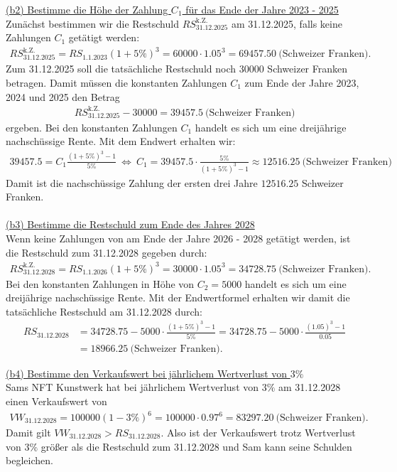 \underline{(b2) Bestimme die Höhe der Zahlung $C_1$ für das Ende der Jahre 2023 - 2025}\\
Zunächst bestimmen wir die Restschuld $RS_{\mathrm{31.12.2025}}^{\mathrm{k.Z.}}$ am 31.12.2025, falls keine Zahlungen $C_1$ getätigt werden:
\begin{align*}
RS_{\mathrm{31.12.2025}}^{\mathrm{k.Z.}}
	=
	RS_{\mathrm{1.1.2023}}
	(1+ 5\% )^3
	=
	60000 \cdot  1.05^3 
	=
	69457.50 \ \textrm{(Schweizer Franken)}.
\end{align*}
Zum 31.12.2025 soll die tatsächliche Restschuld noch $30000$ Schweizer Franken betragen. Damit müssen die konstanten Zahlungen $C_1$ zum Ende der Jahre 2023, 2024 und 2025 den Betrag
\begin{align*}
	RS_{\mathrm{31.12.2025}}^{\mathrm{k.Z.}}
	- 30000
	= 39457.5\ \textrm{(Schweizer Franken)}
\end{align*}
ergeben. Bei den konstanten Zahlungen $C_1$ handelt es sich um eine dreijährige nachschüssige Rente. Mit dem Endwert erhalten wir:
\begin{align*}
	39457.5
	= C_1 \frac{(1 + 5 \%)^3 -1 }{5 \%}
	\ \Leftrightarrow \
	C_1 = 39457.5 \cdot \frac{5 \%}{(1 + 5 \%)^3 -1}
	\approx
	12516.25 \ \textrm{(Schweizer Franken)}
\end{align*}
Damit ist die nachschüssige Zahlung der ersten drei Jahre 
$12516.25$ Schweizer Franken.\\
\\
\underline{(b3) Bestimme die Restschuld zum Ende des Jahres 2028}\\
Wenn keine Zahlungen von am Ende der Jahre 2026 - 2028 getätigt werden, ist die Restschuld zum 31.12.2028 gegeben durch:
\begin{align*}
	RS_{\mathrm{31.12.2028}}^{\mathrm{k.Z.}}
	=
	RS_{\mathrm{1.1.2026}} (1 + 5\%)^3
	=
	30000 \cdot 1.05^3
	=
	34728.75 \ \textrm{(Schweizer Franken)}.
\end{align*}
Bei den konstanten Zahlungen in Höhe von  $C_2 = 5000$ handelt es sich um eine dreijährige nachschüssige Rente. Mit der Endwertformel erhalten wir damit die tatsächliche Restschuld am 31.12.2028 durch:
\begin{align*}
	RS_{\mathrm{31.12.2028}}
	&= 
	34728.75 - 
	5000 
	\cdot 
	\frac{(1+ 5 \%)^3 -1}{5 \%}
	=
	34728.75 - 
	5000 
	\cdot 
	\frac{(1.05)^3 -1}{0.05}\\
	&=
	18966.25 \ \textrm{(Schweizer Franken)}.
\end{align*}


\underline{(b4) Bestimme den Verkaufswert bei jährlichem Wertverlust von $3 \%$}\\
Sams NFT Kunstwerk hat bei jährlichem Wertverlust von $3 \%$ am 31.12.2028 einen Verkaufswert von 
\begin{align*}
	VW_{\mathrm{31.12.2028}}
	=
	100000 (1- 3 \%)^6
	=
	100000 \cdot 0.97^6
	= 83297.20 \ \textrm{(Schweizer Franken)}.
\end{align*}
Damit gilt $VW_{\mathrm{31.12.2028}} > RS_{\mathrm{31.12.2028}}$. Also ist der Verkaufswert trotz Wertverlust von $3 \%$ größer als die Restschuld zum 31.12.2028 und Sam kann seine Schulden begleichen.
\newpage
